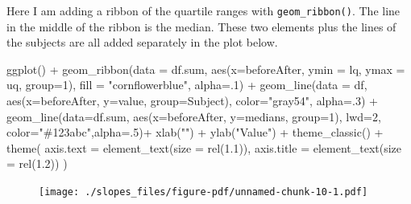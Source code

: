 \documentclass[
  letterpaper,
  DIV=11,
  numbers=noendperiod]{scrreprt}
\newenvironment{Shaded}{\begin{snugshade}}{\end{snugshade}}
\newcommand{\AttributeTok}[1]{\textcolor[rgb]{0.40,0.45,0.13}{#1}}
\newcommand{\DecValTok}[1]{\textcolor[rgb]{0.68,0.00,0.00}{#1}}
\newcommand{\FloatTok}[1]{\textcolor[rgb]{0.68,0.00,0.00}{#1}}
\newcommand{\FunctionTok}[1]{\textcolor[rgb]{0.28,0.35,0.67}{#1}}
\newcommand{\NormalTok}[1]{\textcolor[rgb]{0.00,0.23,0.31}{#1}}
\newcommand{\SpecialCharTok}[1]{\textcolor[rgb]{0.37,0.37,0.37}{#1}}
\newcommand{\StringTok}[1]{\textcolor[rgb]{0.13,0.47,0.30}{#1}}
\begin{document}
Here I am adding a ribbon of the quartile ranges with
\texttt{geom\_ribbon()}. The line in the middle of the ribbon is the
median. These two elements plus the lines of the subjects are all added
separately in the plot below.

\begin{Shaded}
\begin{Highlighting}[]
\FunctionTok{ggplot}\NormalTok{() }\SpecialCharTok{+}
  \FunctionTok{geom\_ribbon}\NormalTok{(}\AttributeTok{data =}\NormalTok{ df.sum,}
              \FunctionTok{aes}\NormalTok{(}\AttributeTok{x=}\NormalTok{beforeAfter,}
                  \AttributeTok{ymin =}\NormalTok{ lq, }
                  \AttributeTok{ymax =}\NormalTok{ uq,}
                  \AttributeTok{group=}\DecValTok{1}\NormalTok{), }
              \AttributeTok{fill =} \StringTok{"cornflowerblue"}\NormalTok{,}
              \AttributeTok{alpha=}\NormalTok{.}\DecValTok{1}\NormalTok{) }\SpecialCharTok{+}
  \FunctionTok{geom\_line}\NormalTok{(}\AttributeTok{data =}\NormalTok{ df, }
            \FunctionTok{aes}\NormalTok{(}\AttributeTok{x=}\NormalTok{beforeAfter, }\AttributeTok{y=}\NormalTok{value, }\AttributeTok{group=}\NormalTok{Subject),}
           \AttributeTok{color=}\StringTok{"gray54"}\NormalTok{, }\AttributeTok{alpha=}\NormalTok{.}\DecValTok{3}\NormalTok{) }\SpecialCharTok{+}
   \FunctionTok{geom\_line}\NormalTok{(}\AttributeTok{data=}\NormalTok{df.sum, }
            \FunctionTok{aes}\NormalTok{(}\AttributeTok{x=}\NormalTok{beforeAfter, }\AttributeTok{y=}\NormalTok{medians, }\AttributeTok{group=}\DecValTok{1}\NormalTok{), }
            \AttributeTok{lwd=}\DecValTok{2}\NormalTok{, }\AttributeTok{color=}\StringTok{"\#123abc"}\NormalTok{,}\AttributeTok{alpha=}\NormalTok{.}\DecValTok{5}\NormalTok{)}\SpecialCharTok{+}
  \FunctionTok{xlab}\NormalTok{(}\StringTok{""}\NormalTok{) }\SpecialCharTok{+}
  \FunctionTok{ylab}\NormalTok{(}\StringTok{"Value"}\NormalTok{) }\SpecialCharTok{+}
  \FunctionTok{theme\_classic}\NormalTok{() }\SpecialCharTok{+}
  \FunctionTok{theme}\NormalTok{(}
    \AttributeTok{axis.text =} \FunctionTok{element\_text}\NormalTok{(}\AttributeTok{size =} \FunctionTok{rel}\NormalTok{(}\FloatTok{1.1}\NormalTok{)),}
    \AttributeTok{axis.title =} \FunctionTok{element\_text}\NormalTok{(}\AttributeTok{size =} \FunctionTok{rel}\NormalTok{(}\FloatTok{1.2}\NormalTok{))}
\NormalTok{  ) }
\end{Highlighting}
\end{Shaded}

\begin{figure}[H]

{\centering \texttt{[image: ./slopes\_files/figure-pdf/unnamed-chunk-10-1.pdf]}

}

\end{figure}
\end{document}
